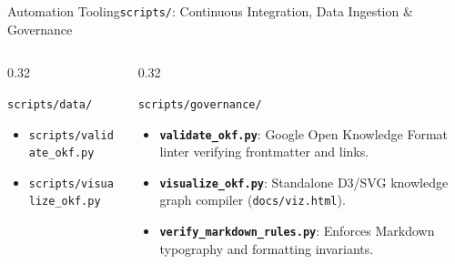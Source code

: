 \begin{frame}{Automation Tooling}{\texttt{scripts/}: Continuous Integration, Data Ingestion \& Governance}
\begin{columns}[T]
\begin{column}{0.32\textwidth}
\begin{block}{\texttt{scripts/data/}}
\begin{itemize}
                    \item \texttt{scripts/validate\_okf.py}
                    \item \texttt{scripts/visualize\_okf.py}
                \end{itemize}
            \end{block}
        \end{column}
        \begin{column}{0.32\textwidth}
            \begin{block}{\texttt{scripts/governance/}}
                \begin{itemize}\scriptsize
                    \item \textbf{\texttt{validate\_okf.py}}: Google Open Knowledge Format linter verifying frontmatter and links.
                    \item \textbf{\texttt{visualize\_okf.py}}: Standalone D3/SVG knowledge graph compiler (\texttt{docs/viz.html}).
                    \item \textbf{\texttt{verify\_markdown\_rules.py}}: Enforces Markdown typography and formatting invariants.
                \end{itemize}
            \end{block}
        \end{column}
    \end{columns}

\end{frame}

